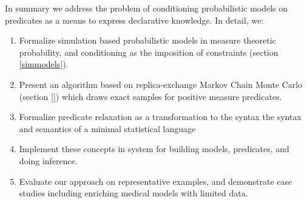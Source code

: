 
In summary we address the problem of conditioning probabilistic models on predicates as a means to express declarative knowledge.
In detail, we:

\begin{enumerate}
	\item Formalize simulation based probabilistic models in measure theoretic probability, and conditioning as the imposition of constraints (section \ref{simmodels}).
	\item Present an algorithm based on replica-exchange Markov Chain Monte Carlo (section \ref{}) which draws exact samples for positive measure predicates. 
	\item Formalize predicate relaxation as a transformation to the syntax   the syntax and semantics of a minimal statistical language 
	\item Implement these concepts in system for building models, predicates, and doing inference.
	\item Evaluate our approach on representative examples, and demonstrate case studies including enriching medical models with limited data.
\end{enumerate}



